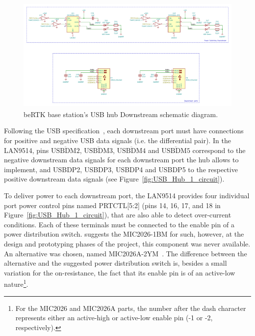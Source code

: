 \begin{figure}[h]
	\centering
	\includegraphics[width=1.0\textwidth]{Chapters/Figures/chapter3/USB_Hub_Downstream.pdf}
	\caption{beRTK\textsuperscript{\textregistered} base station's USB hub Downstream schematic diagram.}
	\label{fig:USB_Hub_Downstream_circuit}
\end{figure}

Following the USB specification~\cite{USB_Specification}, each downstream port must have connections for positive and negative USB data signals (i.e. the differential pair). In the LAN9514, pins $\overline{\mbox{USBDM2}}$, $\overline{\mbox{USBDM3}}$, $\overline{\mbox{USBDM4}}$ and $\overline{\mbox{USBDM5}}$ correspond to the negative downstream data signals for each downstream port the hub allows to implement, and USBDP2, USBDP3, USBDP4 and USBDP5 to the respective positive downstream data signals (see Figure~\ref{fig:USB_Hub_1_circuit}).

To deliver power to each downstream port, the LAN9514 provides four individual port power control pins named PRTCTL[5:2] (pins 14, 16, 17, and 18 in Figure~\ref{fig:USB_Hub_1_circuit}), that are also able to detect over-current conditions. Each of these terminals must be connected to the enable pin of a power distribution switch.
\cite{LAN9514_ref_schematic} suggests the MIC2026-1BM for such, however, at the design and prototyping phases of the project, this component was never available. An alternative was chosen, named MIC2026A-2YM~\cite{MIC2026A}. The difference between the alternative and the suggested power distribution switch is, besides a small variation for the on-resistance, the fact that its enable pin is of an active-low nature\footnote[18]{For the MIC2026 and MIC2026A parts, the number after the dash character represents either an active-high or active-low enable pin (-1 or -2, respectively).}.


